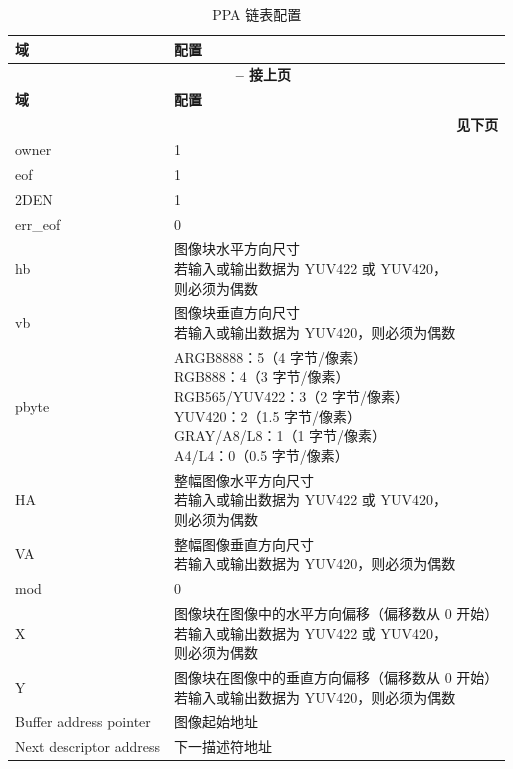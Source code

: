 \documentclass[main\_\_CN.tex]{subfiles}
\begin{document}
\begin{longtable}[c]{ |p{2.5cm}|p{8cm}| }
    \caption{PPA 链表配置}
    \label{tab:ppa_link_list_config}\\\hline

    \rowcolor{lightgray}
    \textbf{域} & \textbf{配置} \\\hline
    \endfirsthead


    \multicolumn{2}{c}{\bfseries \tablename\ \thetable{} -- 接上页}\\\hline
    \rowcolor{lightgray}
    \textbf{域} & \textbf{配置} \\\hline
    \endhead

    \multicolumn{2}{r}{\textbf{见下页}} \\
    \endfoot

    \endlastfoot

        owner & 1 \\\hline
        eof & 1 \\\hline
        2DEN & 1 \\\hline
        err\_eof & 0 \\\hline
        hb & \makecell[l]{图像块水平方向尺寸\\若输入或输出数据为 YUV422 或 YUV420，\\则必须为偶数} \\\hline
        vb & \makecell[l]{图像块垂直方向尺寸\\若输入或输出数据为 YUV420，则必须为偶数} \\\hline
        pbyte & \makecell[l]{ARGB8888：5（4 字节/像素）\\RGB888：4（3 字节/像素）\\RGB565/YUV422：3（2 字节/像素）\\YUV420：2（1.5 字节/像素）\\GRAY/A8/L8：1（1 字节/像素）\\A4/L4：0（0.5 字节/像素）} \\\hline
        HA & \makecell[l]{整幅图像水平方向尺寸\\若输入或输出数据为 YUV422 或 YUV420，\\则必须为偶数} \\\hline
        VA & \makecell[l]{整幅图像垂直方向尺寸\\若输入或输出数据为 YUV420，则必须为偶数} \\\hline
        mod & 0 \\\hline
        X & \makecell[l]{图像块在图像中的水平方向偏移（偏移数从 0 开始）\\若输入或输出数据为 YUV422 或 YUV420，\\则必须为偶数} \\\hline
        Y & \makecell[l]{图像块在图像中的垂直方向偏移（偏移数从 0 开始）\\若输入或输出数据为 YUV420，则必须为偶数} \\\hline
        Buffer address pointer & 图像起始地址 \\\hline
        Next descriptor address & 下一描述符地址 \\\hline

\end{longtable}
\end{document}
